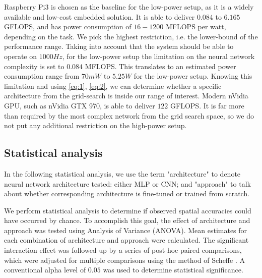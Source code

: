 Raspberry Pi3 is chosen as the baseline for the low-power setup, as it is a widely available and low-cost embedded solution. It is able to deliver $0.084$ to $6.165$ GFLOPS, and has power consumption of $16 - 1200$ MFLOPS per watt, depending on the task. We pick the highest restriction, i.e. the lower-bound of the performance range. Taking into account that the system should be able to operate on $1000 Hz$, for the low-power setup the limitation on the neural network complexity is set to $0.084$ MFLOPS. This translates to an estimated power consumption range from $70mW$ to $5.25W$ for the low-power setup. Knowing this limitation and using \ref{eq:1}, \ref{eq:2}, we can determine whether a specific architecture from the grid-search is inside our range of interest. Modern nVidia GPU, such as nVidia GTX 970, is able to deliver $122$ GFLOPS. It is far more than required by the most complex network from the grid search space, so we do not put any additional restriction on the high-power setup.   


\subsection{Statistical analysis}

In the following statistical analysis, we use the term "architecture" to denote neural network architecture tested: either MLP or CNN; and "approach" to talk about whether corresponding architecture is fine-tuned or trained from scratch. 


We perform statistical analysis to determine if observed spatial accuracies could have occurred by chance. To accomplish this goal, the effect of architecture and approach was tested using Analysis of Variance (ANOVA).  Mean estimates for each combination of architecture and approach were calculated.  The significant interaction effect was followed up by a series of post-hoc paired comparisons, which were adjusted for multiple comparisons using the method of Scheffe \cite{scheffe1967analysis}. A conventional alpha level of $0.05$ was used to determine statistical significance.

